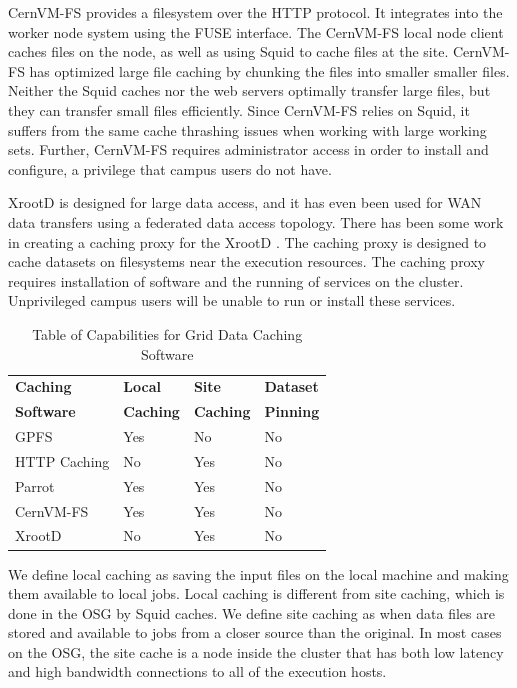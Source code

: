 CernVM-FS \cite{blomer2011cernvm} provides a filesystem over the HTTP protocol.  It integrates into the worker node system using the FUSE \cite{szeredi2010fuse} interface.  The CernVM-FS local node client caches files on the node, as well as using Squid to cache files at the site.  CernVM-FS has optimized large file caching by chunking the files into smaller smaller files.  Neither the Squid caches nor the web servers optimally transfer large files, but they can transfer small files efficiently.  Since CernVM-FS relies on Squid, it suffers from the same cache thrashing issues when working with large working sets.  Further, CernVM-FS requires administrator access in order to install and configure, a privilege that campus users do not have.


XrootD \cite{dorigo2005xrootd} is designed for large data access, and it has even been used for WAN data transfers \cite{bauerdick2012using} using a federated data access topology.  There has been some work in creating a caching proxy for the XrootD \cite{bauerdick2014xrootd}.  The caching proxy is designed to cache datasets on filesystems near the execution resources.  The caching proxy requires installation of software and the running of services on the cluster.  Unprivileged campus users will be unable to run or install these services.

\begin{table}[h!t]
	\centering
	\bgroup
	\def\arraystretch{1.5}
	\begin{tabular}{l | l | l | l }
\textbf{Caching} & \textbf{Local} & \textbf{Site}  & \textbf{Dataset } \\
\textbf{Software} & \textbf{Caching} & \textbf{Caching} & \textbf{Pinning} \\ \hline
GPFS & Yes & No & No \\
HTTP Caching & No & Yes & No \\
Parrot & Yes & Yes & No \\
CernVM-FS & Yes & Yes & No \\
XrootD & No & Yes & No 
	\end{tabular}
	\egroup
	\caption{Table of Capabilities for Grid Data Caching Software}
\end{table}


We define local caching as saving the input files on the local machine and making them available to local jobs.  Local caching is different from site caching, which is done in the OSG by Squid caches.  We define site caching as when data files are stored and available to jobs from a closer source than the original.  In most cases on the OSG, the site cache is a node inside the cluster that has both low latency and high bandwidth connections to all of the execution hosts.

